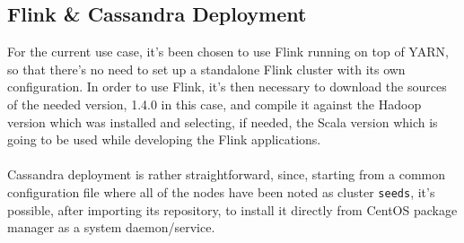 \subsection{Flink \& Cassandra Deployment}
For the current use case, it's been chosen to use Flink running on top of YARN, so that there's no need to set up a standalone Flink cluster with its own configuration. In order to use Flink, it's then necessary to download the sources of the needed version, 1.4.0 in this case, and compile it against the Hadoop version which was installed and selecting, if needed, the Scala version which is going to be used while developing the Flink applications.\\
\\
Cassandra deployment is rather straightforward, since, starting from a common \texttt{} configuration file where all of the nodes have been noted as cluster \texttt{seeds}, it's possible, after importing its repository, to install it directly from CentOS package manager as a system daemon/service.
